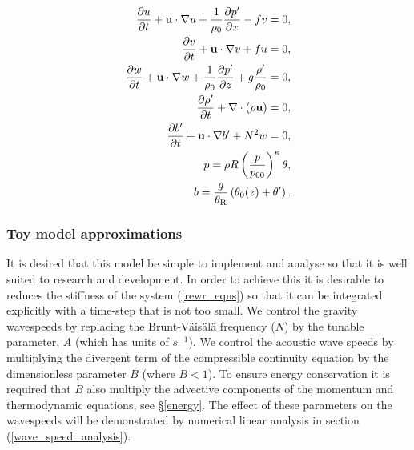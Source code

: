 \documentclass[times]{qjrms4}
\begin{document}
\begin{subequations} \label{rewr_eqns}
 \begin{align}
      \frac{\partial u}{\partial t} + \mathbf u \cdot \nabla u + 
      \frac{1}{\rho_0} \frac{\partial p'}{\partial x} - fv  =  0, 
    \label{u_rewr} \\
      \frac{\partial v}{\partial t} + \mathbf u \cdot \nabla v + fu = 0, 
    \label{v_rewr} \\
     \frac{\partial w}{\partial t} + \mathbf u \cdot \nabla w 
         + \frac{1}{\rho_0} \frac{\partial p'}{\partial z} 
        + g \frac{\rho'}{\rho_0} = 0,
    \label{w_rewr} \\
       \frac {\partial \rho'}{\partial t}  +  \nabla \cdot  \left(\rho \mathbf u \right) =  0 , 
    \label{cont_rewr} \\
    \frac{\partial b'}{\partial t} + \mathbf u \cdot \nabla b' +  N^2 w = 0, \label{thermo_rewr} \\
       p = \rho R \left( \frac{p}{p_{00}} \right)^{\kappa} \theta, \label{eqnstat_rewr} \\
       b = \frac{g }{\theta_{\rm{R}}} \left(\theta_0(z) + \theta' \right). \label{b_system}
 \end{align}
\end{subequations}
\subsubsection{Toy model approximations}\label{toy_model}

It is desired that this model be simple to implement and analyse
so that it is well suited to research and development.  
In order to achieve this it is desirable to reduces the stiffness of the system (\ref{rewr_eqns}) so that it can be integrated explicitly with a time-step 
that is not too small.
We  control the gravity wavespeeds by replacing the Brunt-V\"{a}is\"{a}l\"{a} frequency ($N$) 
by the tunable parameter, $A$ (which has units of $s^{-1}$).  
We control the acoustic wave speeds by multiplying the divergent term of the compressible continuity equation
 by the dimensionless parameter $B$ (where $B<1$). To ensure energy conservation
it is required that $B$ also multiply the advective components of the momentum and thermodynamic
equations, see \S \ref{energy}.
The effect of these parameters on the wavespeeds will be demonstrated by numerical linear analysis 
in section (\ref{wave_speed_analysis}). 
\end{document}
